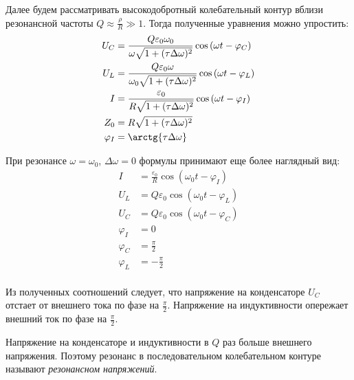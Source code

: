 Далее будем рассматривать высокодобротный колебательный контур вблизи резонансной частоты $Q \approx \frac{\rho}{R} \gg 1$. Тогда полученные уравнения можно упростить:
\begin{equation*}
	\begin{split}
		U_C &= \frac{Q \varepsilon_0 \omega_0}{\omega \sqrt{1 + (\tau \Delta \omega)^2}} \cos \left(\omega t - \varphi_C\right) \\
		U_L &= \frac{Q \varepsilon_0 \omega}{\omega_0 \sqrt{1 + (\tau \Delta \omega)^2}} \cos \left(\omega t - \varphi_L\right) \\
		I &= \frac{\varepsilon_0}{R \sqrt{1 + (\tau \Delta \omega)^2}} \cos \left(\omega t - \varphi_I\right) \\
		Z_0 &= R \sqrt{1 + (\tau \Delta \omega)^2} \\
		\varphi_I &= \arctg{\tau \Delta \omega}	
	\end{split}
\end{equation*}

При резонансе $\omega = \omega_0$, $\Delta \omega = 0$ формулы принимают еще более наглядный вид:
\begin{equation*}
	\begin{split}
		I &= \frac{\varepsilon_0}{R} \cos \left( \omega_0 t - \varphi_I \right) \\
		U_L &= Q \varepsilon_0 \cos \left( \omega_0 t - \varphi_L \right) \\
		U_C &= Q \varepsilon_0 \cos \left( \omega_0 t - \varphi_C \right) \\		
		\varphi_I &= 0 \\
		\varphi_C &= \frac{\pi}{2} \\
		\varphi_L &= -\frac{\pi}{2} \\
	\end{split}
\end{equation*}

Из полученных соотношений следует, что напряжение на конденсаторе $U_C$ отстает от внешнего тока по фазе на $\frac{\pi}{2}$. Напряжение на индуктивности опережает внешний ток по фазе на $\frac{\pi}{2}$.

Напряжение на конденсаторе и индуктивности в $Q$ раз больше внешнего напряжения. Поэтому резонанс в последовательном колебательном контуре называют \textit{резонансном напряжений}.
